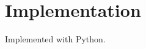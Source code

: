 \documentclass[senior,final,11pt]{iscs-thesis}
\begin{document}
\section{Implementation}
Implemented with Python.
\end{document}
